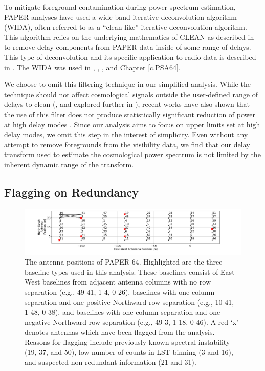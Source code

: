 To mitigate foreground contamination during
power spectrum estimation, PAPER analyses have used
a wide-band iterative deconvolution algorithm (WIDA),
often referred to as a ``clean-like'' iterative
deconvolution algorithm. This algorithm relies on the
underlying mathematics of CLEAN as described in
\citet{hogbom1974} to remove delay components from
PAPER data inside of some range of delays.
This type of deconvolution and its specific
application to radio data is described in \citet{parsons_backer2009}.
The WIDA was used in \citet{parsons_et_al2012b,parsons_et_al2014,jacobs_et_al2015}, , \citet{kerrigan_et_al2018}, and Chapter \ref{c.PSA64}.

We choose to omit this filtering technique in our simplified analysis. While the technique should not
affect cosmological signals outside the user-defined
range of delays to clean (\citealt{parsons_backer2009, parsons_et_al2012b, parsons_et_al2014}, and explored further in \citealt{kerrigan_et_al2018}),
recent works have also shown that the use of this filter does not produce
statistically significant reduction of power at
high delay modes \citep{kerrigan_et_al2018}.
Since our analysis aims to focus on upper limits set
at high delay modes, we omit this step in the interest
of simplicity. Even without any attempt to remove foregrounds from the
visibility data, we find that our delay transform used to estimate
the cosmological power spectrum is not limited by the inherent
dynamic range of the transform.

\subsection{Flagging on Redundancy}
\label{sec:redundancy}

\begin{figure}[tp]
\centering
\includegraphics[trim={3cm 0  4cm 0},width=\textwidth]{plots/psa64_antpos_flagged.pdf}
\caption{The antenna positions of PAPER-64.
Highlighted are the three baseline types used in this analysis.
These baselines consist of East-West baselines from adjacent
antenna columns with no row separation
(e.g., 49-41, 1-4, 0-26),
baselines with one column separation and one positive Northward
row separation (e.g., 10-41, 1-48, 0-38),
and baselines with one column separation
and one negative Northward row separation
(e.g., 49-3, 1-18, 0-46). A red `x' denotes antennas which have been flagged from the analysis. Reasons for
flagging include previously known spectral instability (19, 37, and 50), low number of counts in LST binning (3 and 16), and suspected non-redundant information (21 and 31).} \label{fig:ant_pos}
\end{figure}

